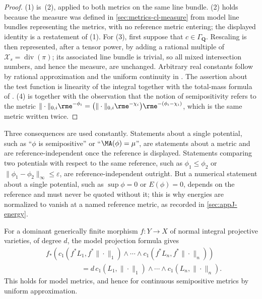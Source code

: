 \begin{proof}
(1) is \,(2), applied to both metrics on the same
line bundle. (2) holds because the measure was
defined in \cref{sec:metrics-cl-measure} from model line bundles
representing the metrics, with no reference metric entering; the displayed
identity is a restatement of (1). For (3), first suppose that
$c\in\Gamma_{\mathbf Q}$. Rescaling is then represented, after a
tensor power, by adding a rational multiple of
$\mathcal X_s=\operatorname{div}(\pi)$; its associated line bundle is
trivial, so all mixed intersection numbers, and hence the measure, are
unchanged. Arbitrary real constants follow by rational approximation and
the uniform continuity in . The assertion
about the test function is linearity of the integral together with the
total-mass formula of
. (4) is
 together with the observation that the
notion of semipositivity refers to the metric $\|\cdot\|_{0,i}\rme^{-\phi_i}
=\bigl(\|\cdot\|_{0,i}\rme^{-\chi_i}\bigr)\rme^{-(\phi_i-\chi_i)}$, which is
the same metric written twice.
\end{proof}

Three consequences are used constantly. Statements about a single potential,
such as ``$\phi$ is semipositive'' or ``$\MA(\phi)=\mu$'', are
statements about a metric and are reference-independent once the reference
is displayed. Statements comparing two potentials with respect to the same
reference, such as $\phi_1\le\phi_2$ or
$\|\phi_1-\phi_2\|_\infty\le\varepsilon$, are reference-independent
outright. But a numerical statement about a single potential, such as
$\sup\phi=0$ or $E(\phi)=0$, depends on the reference and must never be
quoted without it; this is why energies are normalized to vanish at a named
reference metric, as recorded in \cref{sec:appJ-energy}.

For a dominant generically finite morphism $f:Y\to X$ of normal integral
projective varieties, of degree $d$, the model
projection formula gives
\[
 \begin{aligned}
 &f_*\!\left(
 c_1(f^*L_1,f^*\|\cdot\|_1)\wedge\cdots\wedge
 c_1(f^*L_n,f^*\|\cdot\|_n)\right)\\
 &\hspace{5em}=
 d\,c_1(L_1,\|\cdot\|_1)\wedge\cdots\wedge
 c_1(L_n,\|\cdot\|_n).
 \end{aligned}
\]
This holds for model metrics, and hence for continuous semipositive metrics by
uniform approximation.

